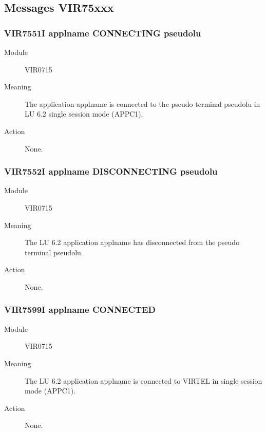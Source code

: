 \documentclass[letterpaper,10pt,english]{sphinxmanual}
\begin{document}
\subsection{Messages VIR75xxx}
\label{\detokenize{messages:messages-vir75xxx}}

\subsubsection{VIR7551I applname CONNECTING pseudolu}
\label{\detokenize{messages:vir7551i-applname-connecting-pseudolu}}\begin{description}
\item[{Module}] \leavevmode
VIR0715

\item[{Meaning}] \leavevmode
The application applname is connected to the pseudo terminal pseudolu in LU 6.2 single session mode (APPC1).

\item[{Action}] \leavevmode
None.

\end{description}


\subsubsection{VIR7552I applname DISCONNECTING pseudolu}
\label{\detokenize{messages:vir7552i-applname-disconnecting-pseudolu}}\begin{description}
\item[{Module}] \leavevmode
VIR0715

\item[{Meaning}] \leavevmode
The LU 6.2 application applname has disconnected from the pseudo terminal pseudolu.

\item[{Action}] \leavevmode
None.

\end{description}


\subsubsection{VIR7599I applname CONNECTED}
\label{\detokenize{messages:vir7599i-applname-connected}}\begin{description}
\item[{Module}] \leavevmode
VIR0715

\item[{Meaning}] \leavevmode
The LU 6.2 application applname is connected to VIRTEL in single session mode (APPC1).

\item[{Action}] \leavevmode
None.

\end{description}
\end{document}
